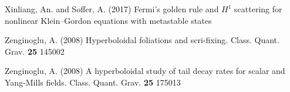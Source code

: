 \begin{thebibliography}{}
 Xinliang, An. and Soffer, A. (2017)
Fermi's golden rule and $H^1$ scattering for nonlinear Klein--Gordon equations with metastable states

 Zenginoglu, A. (2008)
Hyperboloidal foliations and scri-fixing. Class. Quant. Grav. {\bf 25} 145002

 Zenginoglu, A. (2008)
A hyperboloidal study of tail decay rates for scalar and Yang-Mills fields. Class. Quant. Grav. {\bf 25} 175013






\end{thebibliography}
